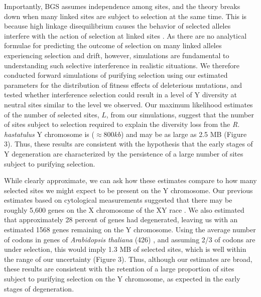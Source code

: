 \documentclass[9pt,twocolumn,twoside,lineno]{gsajnl}
\begin{document}
Importantly, BGS assumes independence among sites, and the theory breaks down when many linked sites are subject to selection at the same time. This is because high linkage disequilibrium causes the behavior of selected alleles interfere with the action of selection at linked sites \citep{good2014genetic,KaiserCharlesworth}. As there are no analytical formulae for predicting the outcome of selection on many linked alleles experiencing selection and drift, however, simulations are fundamental to understanding such selective interference in realistic situations. We therefore conducted forward simulations of purifying selection using our estimated parameters for the distribution of fitness effects of deleterious mutations, and tested whether interference selection could result in a level of Y diversity at neutral sites similar to the level we observed.  Our maximum likelihood estimates of the number of selected sites, $L$, from our simulations, suggest that the number of sites subject to selection required to explain the diversity loss from the \textit{R. hastatulus} Y chromosome is ($\approx 800 kb$) and may be as large as 2.5 MB (Figure 3). Thus, these results are consistent with the hypothesis that the early stages of Y degeneration are characterized by the persistence of a large number of sites subject to purifying selection.

While clearly approximate, we can ask how these estimates compare to how many selected sites we might expect to be present on the Y chromosome. Our previous estimates based on cytological measurements suggested that there may be roughly 5,600 genes on the X chromosome of the XY race \citep{hough2014}. We also estimated that approximately 28 percent of genes had degenerated, leaving us with an estimated 1568 genes remaining on the Y chromosome. Using the average number of codons in genes of \textit{Arabidopsis thaliana} (426) \citep{wortman2003annotation}, and assuming 2/3 of codons are under selection, this would imply 1.3 MB of selected sites, which is well within the range of our uncertainty (Figure 3). Thus, although our estimates are broad, these results are consistent with the retention of a large proportion of sites subject to purifying selection on the Y chromosome, as expected in the early stages of degeneration.
\end{document}
